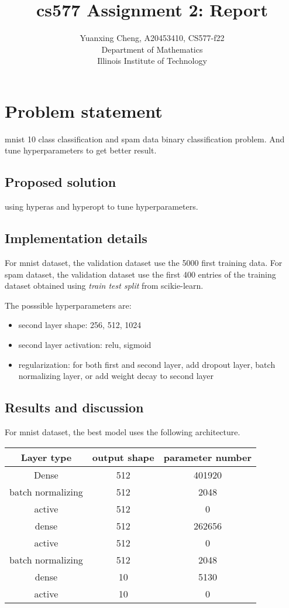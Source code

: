 \documentclass{article}
\title{cs577 Assignment 2: Report}
\author{Yuanxing Cheng, A20453410, CS577-f22\\ Department of Mathematics \\Illinois Institute of Technology}
\begin{document}
\maketitle
\section*{Problem statement}

mnist 10 class classification and spam data binary classification problem. And tune hyperparameters to get better result.

\subsection*{Proposed solution}
using hyperas and hyperopt to tune hyperparameters.

\subsection*{Implementation details}

For mnist dataset, the validation dataset use the 5000 first training data. For spam dataset, the validation dataset use the first 400 entries of the training dataset obtained using {\it train test split} from scikie-learn.

The posssible hyperparameters are: 
\begin{itemize}
    \item second layer shape: 256, 512, 1024
    \item second layer activation: relu, sigmoid
    \item regularization: for both first and second layer, add dropout layer, batch normalizing layer, or add weight decay to second layer
\end{itemize}

\subsection*{Results and discussion}

For mnist dataset, the best model uses the following architecture.

\begin{center}
    \begin{tabular}{ ccc } 
        \hline
        Layer type & output shape & parameter number\\ \hline
        Dense & 512 & 401920 \\ 
        batch normalizing & 512 & 2048\\
        active & 512 & 0\\
        dense & 512 & 262656\\
        active & 512 & 0\\
        batch normalizing & 512 & 2048\\
        dense & 10 & 5130\\
        active & 10 & 0\\ \hline
    \end{tabular}
\end{center}
\end{document}
